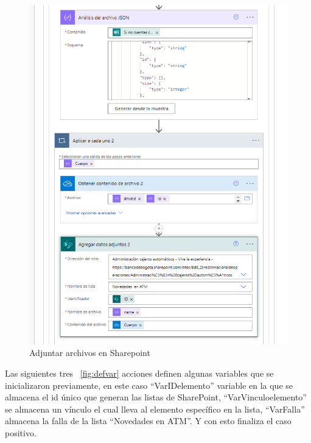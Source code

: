 \begin{figure}[H]
	\centering
	\includegraphics[scale=0.5]{Capitulo3/imagenes/flujo11.png}
	\caption{Adjuntar archivos en Sharepoint}
	\label{fig:Cele2}
\end{figure}

Las siguientes tres ~\ref{fig:defvar} acciones definen algunas variables que se inicializaron previamente, en este caso ``VarIDelemento'' variable en la que se almacena el id único que generan las listas de SharePoint, ``VarVinculoelemento'' se almacena un vínculo el cual lleva al elemento específico en la lista, ``VarFalla'' almacena la falla de la lista ``Novedades en ATM''.  Y con esto finaliza el caso positivo.

